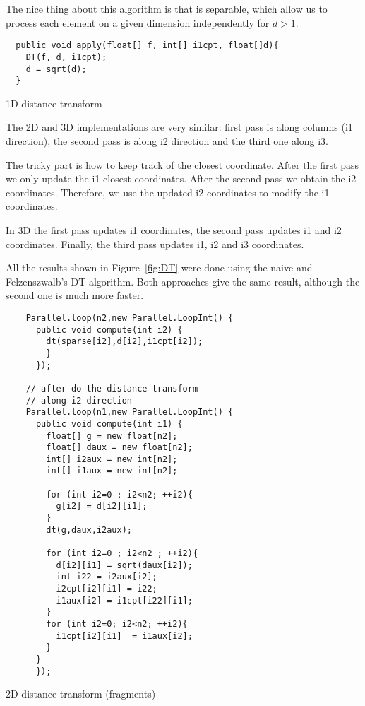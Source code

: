 \documentclass[10pt]{article}
\begin{document}
The nice thing about this algorithm is that is separable, which allow us
to process each element on a given dimension independently for $d>1$.

\begin{program}
\begin{verbatim}
  public void apply(float[] f, int[] i1cpt, float[]d){
    DT(f, d, i1cpt);
    d = sqrt(d);
  }
\end{verbatim}
  \caption{1D distance transform}
  \label{code:1dDT}
\end{program}    

The 2D and 3D implementations are very similar: first pass is along columns (i1 direction),
the second pass is along i2 direction and the third one along i3.

The tricky part is how to keep track of the closest coordinate. After the first pass
we only update the i1 closest coordinates. After the second pass we obtain the i2 coordinates. 
Therefore, we use the updated i2 coordinates to modify the i1 coordinates. 

In 3D the first pass updates i1 coordinates, the second pass updates i1 and i2 coordinates. Finally,
 the third pass updates i1, i2 and i3 coordinates.

All the results shown in Figure~\ref{fig:DT} were done using the naive and Felzenszwalb's 
DT algorithm. Both approaches give the same result, although the second one is much more faster.


\begin{program}
\begin{verbatim}
    Parallel.loop(n2,new Parallel.LoopInt() {
      public void compute(int i2) {
        dt(sparse[i2],d[i2],i1cpt[i2]);
        }
      });
    
    // after do the distance transform
    // along i2 direction  
    Parallel.loop(n1,new Parallel.LoopInt() {
      public void compute(int i1) {
        float[] g = new float[n2]; 
        float[] daux = new float[n2]; 
        int[] i2aux = new int[n2];
        int[] i1aux = new int[n2];
  
        for (int i2=0 ; i2<n2; ++i2){
          g[i2] = d[i2][i1];
        }
        dt(g,daux,i2aux);
  
        for (int i2=0 ; i2<n2 ; ++i2){
          d[i2][i1] = sqrt(daux[i2]);
          int i22 = i2aux[i2];
          i2cpt[i2][i1] = i22;
          i1aux[i2] = i1cpt[i22][i1];
        }
        for (int i2=0; i2<n2; ++i2){
          i1cpt[i2][i1]  = i1aux[i2];
        }
      }
      });
\end{verbatim}
  \caption{2D distance transform (fragments)}
  \label{code:2dDT}
\end{program}    
\end{document}
